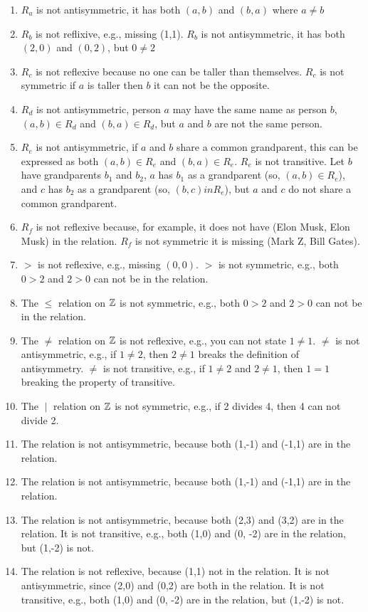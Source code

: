 \begin{questions}
\begin{solution}
\begin{enumerate}[label=(\alph*),itemsep=2pt,parsep=0pt,topsep=0pt,partopsep=0pt]
	\item $R_a$ is not antisymmetric, it has both $(a,b)$ and $(b,a)$ where $a \neq b$
	\item $R_b$ is not reflixive, e.g., missing (1,1). $R_b$ is not antisymmetric, it has both $(2,0)$ and $(0,2)$, but $0 \neq 2$
	\item $R_c$ is not reflexive because no one can be taller than themselves.  $R_c$ is not symmetric if $a$ is taller then $b$ it can not be the opposite.
	\item $R_d$ is not antisymmetric, person $a$ may have the same name as person $b$, $(a, b) \in R_d$ and $(b,a) \in R_d$, but $a$ and $b$ are not the same person.  
	\item $R_e$ is not antisymmetric, if $a$ and $b$ share a common grandparent, this can be expressed as both $(a,b) \in R_e$ and $(b,a) \in R_e$.  $R_e$ is not transitive.  Let $b$ have grandparents $b_1$ and $b_2$, $a$ has $b_1$ as a grandparent (so, $(a,b) \in R_e$), and $c$ has $b_2$ as a grandparent (so, $(b,c) in R_e$), but $a$ and $c$ do not share a common grandparent.
	\item $R_f$ is not reflexive because, for example, it does not have (Elon Musk, Elon Musk) in the relation.  $R_f$ is not symmetric it is missing (Mark Z, Bill Gates). 
	\item $>$ is not reflexive, e.g., missing $(0,0)$.  $>$ is not symmetric, e.g., both $0 > 2$ and $2 > 0$ can not be in the relation. 
	\item The $\leq$ relation on $\mathbb{Z}$ is not symmetric, e.g., both $0 > 2$ and $2 > 0$ can not be in the relation. 
	\item The $\neq$ relation on $\mathbb{Z}$ is not reflexive, e.g., you can not state $1 \neq 1$.  $\neq$ is not antisymmetric, e.g., if $1 \neq 2$, then $2 \neq 1$ breaks the definition of antisymmetry.  $\neq$  is not transitive, e.g., if $1 \neq 2$ and $2 \neq 1$, then $1 = 1$ breaking the property of transitive.  
	\item The $\;|\;$ relation on $\mathbb{Z}$ is not symmetric, e.g., if 2 divides 4, then 4 can not divide 2.
	\item The relation is not antisymmetric, because both (1,-1) and (-1,1) are in the relation. 
	\item The relation is not antisymmetric, because both (1,-1) and (-1,1) are in the relation.
	\item The relation is not antisymmetric, because both (2,3) and (3,2) are in the relation.  It is not transitive, e.g., both (1,0) and (0, -2) are in the relation, but (1,-2) is not. 
	\item The relation is not reflexive, because (1,1) not in the relation.  It is not antisymmetric, since (2,0) and (0,2) are both in the relation.  It is not transitive, e.g., both (1,0) and (0, -2) are in the relation, but (1,-2) is not. 
\end{enumerate}



\end{solution}
\end{questions}

